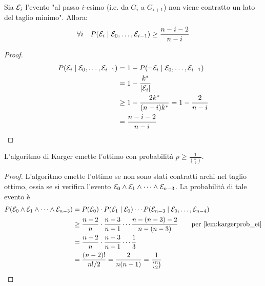 \begin{lemma}\label{lem:kargerprob_ei}
	Sia $\mathcal E_i$ l'evento "al passo $i$-esimo (i.e. da $G_i$ a $G_{i+1}$) non viene contratto un lato del taglio minimo". Allora:
	\begin{equation*}
		\forall i \quad P(\mathcal E_i \mid \mathcal E_0, \dots, \mathcal E_{i-1}) \geq \frac{n-i-2}{n-i}
	\end{equation*}
\end{lemma}
\begin{proof}
	\begin{align*}
		P(\mathcal E_i \mid \mathcal E_0,\dots,\mathcal E_{i-1}) & = 1-P(\lnot \mathcal E_i \mid \mathcal E_0,\dots,\mathcal E_{i -1})    \\
		                                       & = 1-\frac{k^*}{| \mathcal E_i |}                     \\
		                                       & \geq 1-\frac{2k^*}{(n-i)k^*} = 1-\frac{2}{n-i} \\
		                                       & = \frac{n-i-2}{n-i}
	\end{align*}
\end{proof}

\begin{theorem}
	L'algoritmo di Karger emette l'ottimo con probabilità $p \geq \frac{1}{\binom n2}$.
\end{theorem}
\begin{proof}
	L'algoritmo emette l'ottimo se non sono stati contratti archi nel taglio ottimo, ossia se si verifica l'evento $\mathcal E_0\land \mathcal E_1\land\dots\land \mathcal E_{n-3}$. La probabilità di tale evento è
	\begin{align*}
		P(\eve_0\land \eve_1\land\dots\land \eve_{n-3}) & =P(\eve_0)\cdot P(\eve_1\mid \eve_0)\cdots P(\eve_{n-3}\mid \eve_0,\dots,\eve_{n-4})                            \\
		                                                & \geq\frac{n-2}{n}\cdot\frac{n-3}{n-1}\cdots\frac{n-(n-3)-2}{n-(n-3)} \qquad \text{per \cref{lem:kargerprob_ei}} \\
		                                                & =\frac{n-2}{n}\cdot\frac{n-3}{n-1}\cdots\frac{1}{3}                                                             \\
		                                                & =\frac{(n-2)!}{n!/2}=\frac{2}{n(n-1)}=\frac{1}{\binom{n}{2}}
	\end{align*}
\end{proof}

